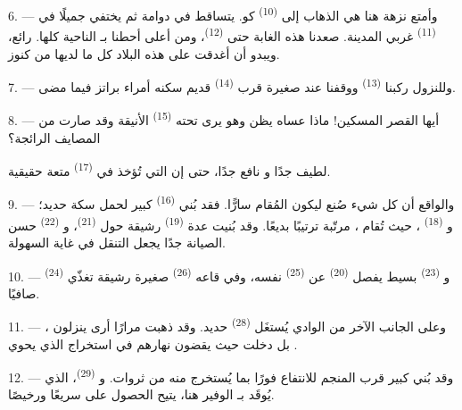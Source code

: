 6. --- وأمتع نزهة هنا هي الذهاب إلى  \textsuperscript{(10)} كو.
 يتساقط في دوامة ثم يختفي  جميلًا في
 \textsuperscript{(11)} غربي المدينة. صعدنا هذه الغابة حتى
 \textsuperscript{(12)}، ومن أعلى  أحطنا
بـ الناحية كلها.  رائع، ويبدو أن
 أغدقت على هذه البلاد كل ما لديها من كنوز.

7. --- وللنزول ركبنا  \textsuperscript{(13)} ووقفنا عند
 صغيرة قرب  \textsuperscript{(14)} 
قديم سكنه أمراء براتز فيما مضى.

8. --- أيها القصر المسكين! ماذا عساه يظن وهو يرى تحته  \textsuperscript{(15)} الأنيقة وقد صارت  من
المصايف الرائجة؟

 لطيف جدًا و نافع جدًا، حتى إن
 التي تُؤخذ في  \textsuperscript{(17)} متعة
حقيقية.

\VUsaut{3.0mm}
\VUsaut{3.0mm}

9. --- والواقع أن كل شيء صُنع ليكون المُقام سارًّا. فقد بُني  \textsuperscript{(16)} كبير لحمل سكة حديد؛ و \textsuperscript{(18)}
، حيث تُقام ، مرتّبة ترتيبًا
بديعًا. وقد بُنيت عدة  \textsuperscript{(19)} رشيقة حول
 \textsuperscript{(21)}، و \textsuperscript{(22)}
حسن الصيانة جدًا يجعل التنقل في غاية السهولة.

10. --- و \textsuperscript{(23)} بسيط يفصل 
\textsuperscript{(20)} عن  \textsuperscript{(25)} نفسه، وفي قاعه
 \textsuperscript{(26)} صغيرة رشيقة تغذّي 
\textsuperscript{(24)} صافيًا.

11. --- وعلى الجانب الآخر من الوادي يُستغَل  \textsuperscript{(28)}
حديد. وقد ذهبت مرارًا أرى  ينزلون ، بل
دخلت  حيث يقضون نهارهم في استخراج  الذي يحوي
.

12. --- وقد بُني  كبير قرب المنجم للانتفاع فورًا بما يُستخرج
منه من ثروات. و \textsuperscript{(29)}، الذي يُوقَد
بـ الوفير هنا، يتيح الحصول على  سريعًا
ورخيصًا.

